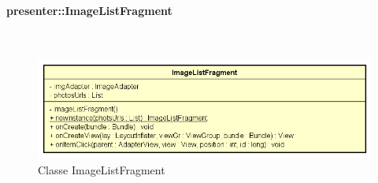 \documentclass[../DefinizioneDiProdotto.tex]{subfiles}
\begin{document}
\paragraph{presenter::ImageListFragment}
\
\begin{figure}[H]
	\centering
	\includegraphics[width=\maxwidth]{img/ImageListFragment.png}
	\caption{Classe ImageListFragment}\label{fig:presenter::ImageListFragment} 
\end{figure}
\end{document}
